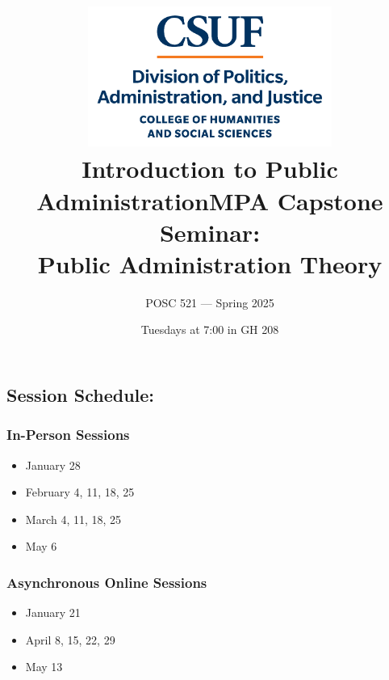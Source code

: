 \documentclass[12pt, letterpaper]{article}
\begin{document}
\title{\includegraphics[width=8cm]{Images/stacked.png} \\ \textbf{Introduction to Public Administration}}

\title{MPA Capstone Seminar: \\ Public Administration Theory}
\author{POSC 521 — Spring 2025}
\date{Tuesdays at 7:00 in GH 208}
    \maketitle
        \subsection*{Session Schedule:}
                    
                    \begin{multicols}{2}
                    \subsubsection*{In-Person Sessions}
                    \begin{itemize}[leftmargin=*]
                        \item January 28
                        \item February 4, 11, 18, 25
                        \item March 4, 11, 18, 25
                        \item May 6
                    \end{itemize}
                    
                    \columnbreak
                    
                    \subsubsection*{Asynchronous Online Sessions}
                    \begin{itemize}[leftmargin=*]
                        \item January 21
                        \item April 8, 15, 22, 29
                        \item May 13
                    \end{itemize}
                    \end{multicols}
\end{document}
